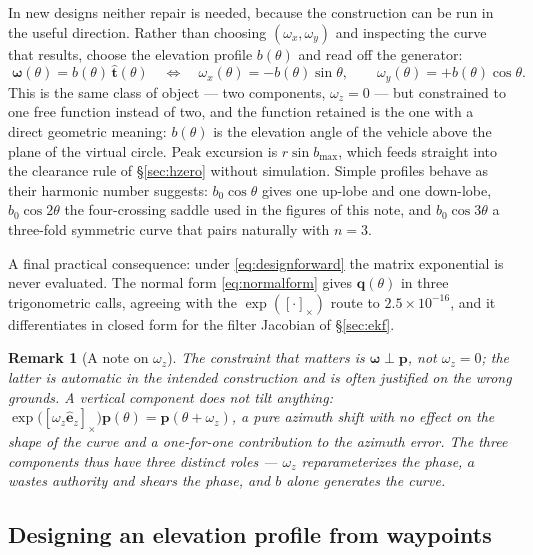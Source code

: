 \documentclass[11pt,a4paper]{article}
\newtheorem{remark}{Remark}
\newcommand{\ez}{\hat{\bm{e}}_z}
\newcommand{\q}{\bm{q}}
\newcommand{\pv}{\bm{p}}
\newcommand{\skewm}[1]{\left[#1\right]_\times}
\newcommand{\that}{\hat{\bm{t}}}
\begin{document}
In new designs neither repair is needed, because the construction can be run in
the useful direction. Rather than choosing $(\omega_x,\omega_y)$ and inspecting
the curve that results, choose the elevation profile $b(\theta)$ and read off
the generator:
\begin{equation}
\boxed{\;
\bm\omega(\theta) = b(\theta)\,\that(\theta)
\quad\Longleftrightarrow\quad
\omega_x(\theta) = -b(\theta)\sin\theta,
\qquad
\omega_y(\theta) = +b(\theta)\cos\theta .
\;}
\label{eq:designforward}
\end{equation}
This is the same class of object --- two components, $\omega_z=0$ --- but
constrained to one free function instead of two, and the function retained is
the one with a direct geometric meaning: $b(\theta)$ is the elevation angle of
the vehicle above the plane of the virtual circle. Peak excursion is
$r\sin b_{\max}$, which feeds straight into the clearance rule of
\S\ref{sec:hzero} without simulation. Simple profiles behave as their harmonic
number suggests: $b_0\cos\theta$ gives one up-lobe and one down-lobe,
$b_0\cos2\theta$ the four-crossing saddle used in the figures of this note, and
$b_0\cos3\theta$ a three-fold symmetric curve that pairs naturally with $n=3$.

A final practical consequence: under \eqref{eq:designforward} the matrix
exponential is never evaluated. The normal form \eqref{eq:normalform} gives
$\q(\theta)$ in three trigonometric calls, agreeing with the $\exp(\skewm{\cdot})$
route to $2.5\times10^{-16}$, and it differentiates in closed form for the
filter Jacobian of \S\ref{sec:ekf}.

\begin{remark}[A note on $\omega_z$]
\label{rem:omegaz}
The constraint that matters is $\bm\omega \perp \pv$, not $\omega_z = 0$; the
latter is automatic in the intended construction and is often justified on the
wrong grounds. A vertical component does not tilt anything:
$\exp\!\big(\skewm{\omega_z\ez}\big)\pv(\theta) = \pv(\theta + \omega_z)$, a
pure azimuth shift with no effect on the shape of the curve and a
one-for-one contribution to the azimuth error. The three components thus have
three distinct roles --- $\omega_z$ reparameterizes the phase, $a$ wastes
authority and shears the phase, and $b$ alone generates the curve.
\end{remark}


\subsection{Designing an elevation profile from waypoints}
\label{sec:waypoints}
\end{document}
